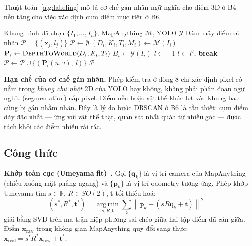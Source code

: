 \documentclass[10pt,a4paper,twocolumn]{article}
\begin{document}
Thuật toán~\ref{alg:labeling} mô tả cơ chế gán nhãn ngữ nghĩa cho điểm 3D ở B4 — nền tảng cho việc xác định cụm điểm mục tiêu ở B6.

\begin{algorithm}[H]
\footnotesize
\caption{Gán nhãn ngữ nghĩa cho đám mây điểm 3D}
\label{alg:labeling}
\begin{algorithmic}[1]
\Require Khung hình đã chọn $\{I_1, \dots, I_n\}$; MapAnything $\mathcal{M}$; YOLO $\mathcal{Y}$
\Ensure Đám mây điểm có nhãn $\mathcal{P} = \{(\mathbf{x}_j, l_j)\}$
\State $\mathcal{P} \gets \emptyset$
    \State $(D_i, K_i, T_i, M_i) \gets \mathcal{M}(I_i)$ 
    \State $\mathbf{P}_i \gets \textsc{DepthToWorld}(D_i, K_i, T_i)$
    \State $B_i \gets \mathcal{Y}(I_i)$ 
        \State $l \gets -1$ 
                \State $l \gets l'$; \textbf{break}
            \EndIf
        \EndFor
        \State $\mathcal{P} \gets \mathcal{P} \cup \{(\mathbf{P}_i(u, v),\ l)\}$
    \EndFor
\EndFor
\State \Return $\mathcal{P}$
\end{algorithmic}
\end{algorithm}

\textbf{Hạn chế của cơ chế gán nhãn.} Phép kiểm tra ở dòng 8 chỉ xác định pixel có nằm trong \emph{khung chữ nhật} 2D của YOLO hay không, không phải phân đoạn ngữ nghĩa (segmentation) cấp pixel. Điểm nền hoặc vật thể khác lọt vào khung bao cũng bị gán nhầm nhãn. Đây là lý do bước DBSCAN ở B6 là cần thiết: cụm điểm dày đặc nhất — ứng với vật thể thật, quan sát nhất quán từ nhiều góc — được tách khỏi các điểm nhiễu rải rác.

\subsection{Công thức}
\label{sec:math}

\textbf{Khớp toàn cục (Umeyama fit)~\cite{umeyama}.} Gọi $\{\mathbf{q}_k\}$ là vị trí camera của MapAnything (chiếu xuống mặt phẳng ngang) và $\{\mathbf{p}_k\}$ là vị trí odometry tương ứng. Phép khớp Umeyama tìm $s \in \mathbb{R}$, $R \in SO(2)$, $\mathbf{t}$ tối thiểu hoá:
\begin{equation}
(s^*, R^*, \mathbf{t}^*) = \operatorname*{arg\,min}_{s, R, \mathbf{t}} \sum_k \left\lVert \mathbf{p}_k - \left(s R \mathbf{q}_k + \mathbf{t}\right) \right\rVert^2
\end{equation}
giải bằng SVD trên ma trận hiệp phương sai chéo giữa hai tập điểm đã căn giữa. Điểm $\mathbf{x}_{\text{raw}}$ trong không gian MapAnything quy đổi sang thực: $\mathbf{x}_{\text{real}} = s^* R^* \mathbf{x}_{\text{raw}} + \mathbf{t}^*$.
\end{document}
